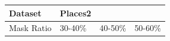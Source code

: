 \begin{tabular}{llll}
\toprule
Dataset & Places2 &  &  \\
\midrule
Mask Ratio & 30-40\% & 40-50\% & 50-60\% \\
\bottomrule
\end{tabular}
